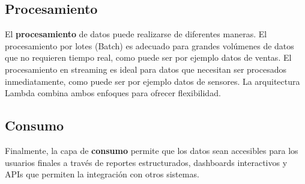 \documentclass[12pt]{article}
\begin{document}
\subsection{Procesamiento}
El \textbf{procesamiento} de datos puede realizarse de diferentes maneras. El procesamiento por lotes (Batch) es adecuado para grandes volúmenes de datos que no requieren tiempo real, como puede ser por ejemplo datos de ventas. El procesamiento en streaming es ideal para datos que necesitan ser procesados inmediatamente, como puede ser por ejemplo datos de sensores. La arquitectura Lambda combina ambos enfoques para ofrecer flexibilidad.

\subsection{Consumo}
Finalmente, la capa de \textbf{consumo} permite que los datos sean accesibles para los usuarios finales a través de reportes estructurados, dashboards interactivos y APIs que permiten la integración con otros sistemas.
\end{document}
